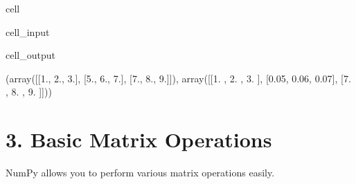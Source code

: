 \documentclass[letterpaper,10pt,english]{jupyterBook}
\begin{document}
\begin{sphinxuseclass}{cell}\begin{sphinxVerbatimInput}

\begin{sphinxuseclass}{cell_input}
\begin{sphinxVerbatim}[commandchars=\\\{\}]
  
\PYG{p}{[}\PYG{p}{]}  \PYG{p}{[}\PYG{p}{]}  
 
\end{sphinxVerbatim}

\end{sphinxuseclass}\end{sphinxVerbatimInput}
\begin{sphinxVerbatimOutput}

\begin{sphinxuseclass}{cell_output}
\begin{sphinxVerbatim}[commandchars=\\\{\}]
(array([[1., 2., 3.],
        [5., 6., 7.],
        [7., 8., 9.]]),
 array([[1.  , 2.  , 3.  ],
        [0.05, 0.06, 0.07],
        [7.  , 8.  , 9.  ]]))
\end{sphinxVerbatim}

\end{sphinxuseclass}\end{sphinxVerbatimOutput}

\end{sphinxuseclass}

\section{3. Basic Matrix Operations}
\label{\detokenize{lessons/Intro_to_Matrices_in_NumPy:basic-matrix-operations}}
\sphinxAtStartPar
NumPy allows you to perform various matrix operations easily.
\end{document}
